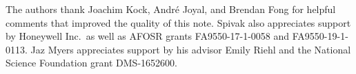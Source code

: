 \documentclass[11pt, article, one side]{memoir}
\theoremstyle{theorem}
\theoremstyle{definition}
\theoremstyle{remark}
\newcommand{\Cat}[1]{\mathsf{#1}}%
\newcommand{\ol}[1]{\overline{#1}}
\newcommand{\bun}{\Cat{Bun}}
\newcommand{\yon}{\mathcal{y}}
\newcommand{\poly}{\Cat{Poly}}
\newcommand{\dir}{\Cat{Dir}}
\newcommand{\ff}{\mathbb{F}}
\newcommand{\qqand}{\qquad\text{and}\qquad}
\begin{document}
The authors thank Joachim Kock, Andr\'{e} Joyal, and Brendan Fong for helpful
comments that improved the quality of this note. Spivak also appreciates support
by Honeywell Inc.\ as well as AFOSR grants FA9550-17-1-0058 and
FA9550-19-1-0113. Jaz Myers appreciates support by his advisor Emily Riehl and the National Science Foundation grant DMS-1652600.

%
%
%
\end{document}

